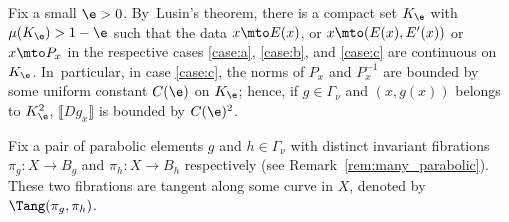 Fix a small $\e>0$. By~Lusin's
theorem, there is a compact set $K_\e $ with $\mu(K_\e)>1-\e$
such that the data $x\mto E(x)$, or $x\mto (E(x), E'(x))$ or $x\mto P_x$ in the respective
cases \eqref{case:a}, \eqref{case:b}, and \eqref{case:c}
are continuous on $K_\e$. In~particular, in case \eqref{case:c}, the norms of $P_x$ and $P_x^{-1}$ are bounded by some uniform constant $C(\e)$
on $K_\e$; hence, if $g\in \Gamma_\nu$ and $(x,g(x))$ belongs to $K_\e^2$, $\llbracket Dg_x \rrbracket$ is bounded by $C(\e)^2$.

Fix a pair of parabolic elements $g$ and $h\in \Gamma_\nu$ with distinct invariant fibrations $\pi_g\colon X\to B_g$ and $\pi_h\colon X\to B_h$
respectively (see Remark~\ref{rem:many_parabolic}). These two fibrations are tangent along some curve in $X$, denoted by $\Tang(\pi_g, \pi_h)$.

